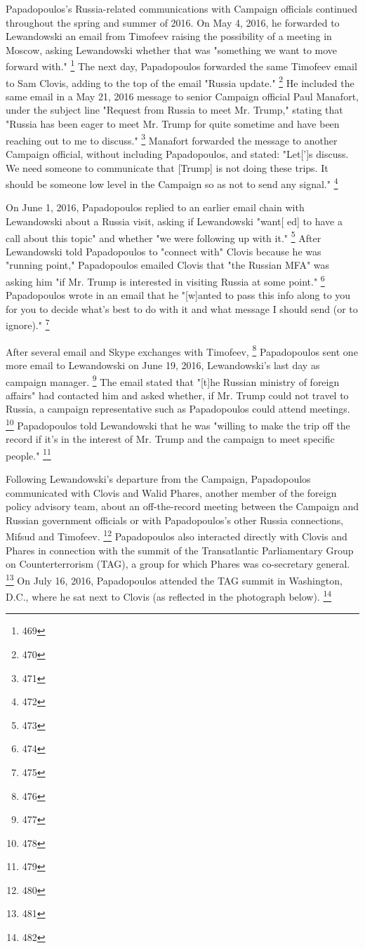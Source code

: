 Papadopoulos's Russia-related communications with Campaign officials continued throughout the spring and summer of 2016.
On May 4, 2016, he forwarded to Lewandowski an email from Timofeev raising the possibility of a meeting in Moscow, asking Lewandowski whether that was "something we want to move forward with."%
\footnote{469}
The next day, Papadopoulos forwarded the same Timofeev email to Sam Clovis, adding to the top of the email "Russia update."%
\footnote{470}
He included the same email in a May 21, 2016 message to senior Campaign official Paul Manafort, under the subject line "Request from Russia to meet Mr. Trump," stating that "Russia has been eager to meet Mr. Trump for quite sometime and have been reaching out to me to discuss."%
\footnote{471}
Manafort forwarded the message to another Campaign official, without including Papadopoulos, and stated: "Let[']s discuss.
We need someone to communicate that [Trump] is not doing these trips.
It should be someone low level in the Campaign so as not to send any signal."%
\footnote{472}

On June 1, 2016, Papadopoulos replied to an earlier email chain with Lewandowski about a Russia visit, asking if Lewandowski "want[ ed] to have a call about this topic" and whether "we were following up with it."%
\footnote{473}
After Lewandowski told Papadopoulos to "connect with" Clovis because he was "running point," Papadopoulos emailed Clovis that "the Russian MFA" was asking him "if Mr. Trump is interested in visiting Russia at some point."%
\footnote{474}
Papadopoulos wrote in an email that he "[w]anted to pass this info along to you for you to decide what's best to do with it and what message I should send (or to ignore)."%
\footnote{475}

After several email and Skype exchanges with Timofeev,%
\footnote{476}
Papadopoulos sent one more email to Lewandowski on June 19, 2016, Lewandowski's last day as campaign manager.%
\footnote{477}
The email stated that "[t]he Russian ministry of foreign affairs" had contacted him and asked whether, if Mr. Trump could not travel to Russia, a campaign representative such as Papadopoulos could attend meetings.%
\footnote{478}
Papadopoulos told Lewandowski that he was "willing to make the trip off the record if it's in the interest of Mr. Trump and the campaign to meet specific people."%
\footnote{479}

Following Lewandowski's departure from the Campaign, Papadopoulos communicated with Clovis and Walid Phares, another member of the foreign policy advisory team, about an off-the-record meeting between the Campaign and Russian government officials or with Papadopoulos's other Russia connections, Mifsud and Timofeev.%
\footnote{480}
Papadopoulos also interacted directly with Clovis and Phares in connection with the summit of the Transatlantic Parliamentary Group on Counterterrorism (TAG), a group for which Phares was co-secretary general.%
\footnote{481}
On July 16, 2016, Papadopoulos attended the TAG summit in Washington, D.C., where he sat next to Clovis (as reflected in the photograph below).%
\footnote{482}

